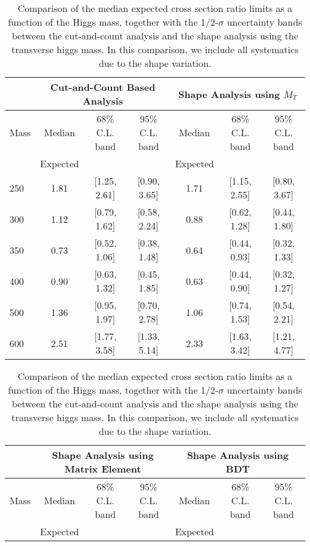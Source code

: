 \begin{table}[!ht]
\begin{center}
{\normalsize
\begin{tabular}{|l|c|c|c|c|c|c|}
\hline
      &  \multicolumn{3}{c|}{Cut-and-Count Based Analysis} &\multicolumn{3}{c|}{Shape Analysis using $M_T$} \\
\hline
Mass  &  Median      &     68\% C.L. band &  95\% C.L. band &  Median	   &	 68\% C.L. band &  95\% C.L. band\\
      &  Expected    &                    &                 &  Expected    &			&		 \\
\hline
250 & 1.81 & [1.25, 2.61] & [0.90, 3.65] & 1.71 & [1.15, 2.55] & [0.80, 3.67] \\
300 & 1.12 & [0.79, 1.62] & [0.58, 2.24] & 0.88 & [0.62, 1.28] & [0.44, 1.80] \\
350 & 0.73 & [0.52, 1.06] & [0.38, 1.48] & 0.64 & [0.44, 0.93] & [0.32, 1.33] \\
400 & 0.90 & [0.63, 1.32] & [0.45, 1.85] & 0.63 & [0.44, 0.90] & [0.32, 1.27] \\
500 & 1.36 & [0.95, 1.97] & [0.70, 2.78] & 1.06 & [0.74, 1.53] & [0.54, 2.21]\\
600 & 2.51 & [1.77, 3.58] & [1.33, 5.14] & 2.33 & [1.63, 3.42] & [1.21, 4.77]\\
\hline
\end{tabular}
}
\caption{\fixme Comparison of the median expected cross section ratio limits as a function 
of the Higgs mass, together with the 1/2-$\sigma$ uncertainty bands between the cut-and-count 
analysis and the shape analysis using the transverse higgs mass. In this comparison, we include all systematics due to 
the shape variation. }
\label{tab:mva_mtshapevscuts_withshapevar_hzz}
\end{center}
\begin{center}
{\normalsize
\begin{tabular}{|l|c|c|c|c|c|c|}
\hline
      &  \multicolumn{3}{c|}{Shape Analysis using Matrix Element} &\multicolumn{3}{c|}{Shape Analysis using BDT} \\
\hline
Mass  &  Median      &     68\% C.L. band &  95\% C.L. band &  Median	   &	 68\% C.L. band &  95\% C.L. band\\
      &  Expected    &                    &                 &  Expected    &			&		 \\

\end{tabular}}
\end{center}
\end{table}
